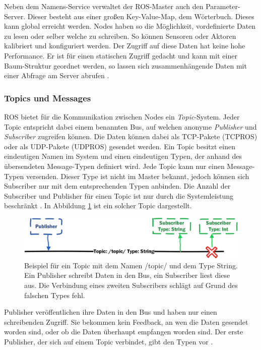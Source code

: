  Neben dem Namens-Service verwaltet der ROS-Master auch den Parameter-Server. Dieser besteht aus einer großen Key-Value-Map, dem Wörterbuch. Dieses kann global erreicht werden. Nodes haben so die Möglichkeit, vordefinierte Daten zu lesen oder selber welche zu schreiben. So können Sensoren oder Aktoren kalibriert und konfiguriert werden. Der Zugriff auf diese Daten hat keine hohe Performance. Er ist für einen statischen Zugriff gedacht und kann mit einer Baum-Struktur geordnet werden, so lassen sich zusammenhängende Daten mit einer Abfrage am Server abrufen \citep{roswiki}.

\subsubsection{Topics und Messages}
\label{sec:basic-ros-topics}

ROS bietet für die Kommunikation zwischen Nodes ein \textit{Topic}-System. Jeder Topic entspricht dabei einem benannten Bus, auf welchen anonyme \textit{Publisher} und \textit{Subscriber} zugreifen können. Die Daten können dabei als TCP-Pakete (TCPROS) oder als UDP-Pakete (UDPROS) gesendet werden. Ein Topic besitzt einen eindeutigen Namen im System und einen eindeutigen Typen, der anhand des übersendeten Message-Typen definiert wird. Jede Topic kann nur einen Message-Typen versenden. Dieser Type ist nicht im Master bekannt, jedoch können sich Subscriber nur mit dem entsprechenden Typen anbinden. Die Anzahl der Subscriber und Publisher für einen Topic ist nur durch die Systemleistung beschränkt \citep{roswiki}. In Abbildung \ref{fig:basic-ros-topic} ist ein solcher Topic dargestellt.

\begin{figure}[h]
	\centering
	\includegraphics[scale=0.8]{fig/topic}   
	\caption[Topic Beispiel]{Beispiel für ein Topic mit dem Namen /topic/ und dem Type String. Ein Publisher schreibt Daten in den Bus, ein Subscriber liest diese aus. Die Verbindung eines zweiten Subscribers schlägt auf Grund des falschen Types fehl.}
	\label{fig:basic-ros-topic}
\end{figure}

Publisher veröffentlichen ihre Daten in den Bus und haben nur einen schreibenden Zugriff. Sie bekommen kein Feedback, an wen die Daten gesendet worden sind, oder ob die Daten überhaupt empfangen worden sind. Der erste Publisher, der sich auf einem Topic verbindet, gibt den Typen vor \citep{roswiki}.

